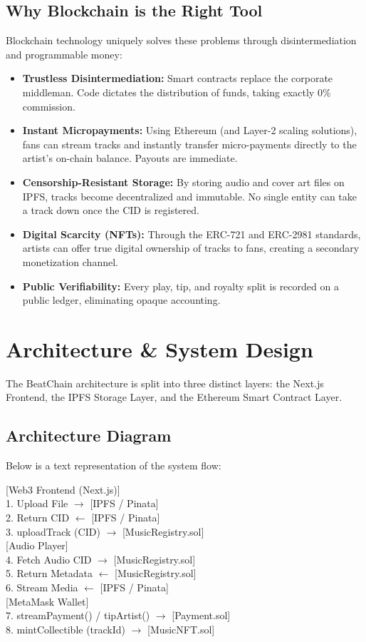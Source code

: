 \documentclass[11pt,a4paper]{article}
\begin{document}
\subsection{Why Blockchain is the Right Tool}
Blockchain technology uniquely solves these problems through disintermediation and programmable money:
\begin{itemize}
    \item \textbf{Trustless Disintermediation:} Smart contracts replace the corporate middleman. Code dictates the distribution of funds, taking exactly 0\% commission.
    \item \textbf{Instant Micropayments:} Using Ethereum (and Layer-2 scaling solutions), fans can stream tracks and instantly transfer micro-payments directly to the artist's on-chain balance. Payouts are immediate.
    \item \textbf{Censorship-Resistant Storage:} By storing audio and cover art files on IPFS, tracks become decentralized and immutable. No single entity can take a track down once the CID is registered.
    \item \textbf{Digital Scarcity (NFTs):} Through the ERC-721 and ERC-2981 standards, artists can offer true digital ownership of tracks to fans, creating a secondary monetization channel.
    \item \textbf{Public Verifiability:} Every play, tip, and royalty split is recorded on a public ledger, eliminating opaque accounting.
\end{itemize}

\section{Architecture \& System Design}
The BeatChain architecture is split into three distinct layers: the Next.js Frontend, the IPFS Storage Layer, and the Ethereum Smart Contract Layer.

\subsection{Architecture Diagram}
Below is a text representation of the system flow:
\begin{center}
    [Web3 Frontend (Next.js)] \\
    1. Upload File $\to$ [IPFS / Pinata] \\
    2. Return CID $\leftarrow$ [IPFS / Pinata] \\
    3. uploadTrack (CID) $\to$ [MusicRegistry.sol] \\
    \vspace{0.5em}
    [Audio Player] \\
    4. Fetch Audio CID $\to$ [MusicRegistry.sol] \\
    5. Return Metadata $\leftarrow$ [MusicRegistry.sol] \\
    6. Stream Media $\leftarrow$ [IPFS / Pinata] \\
    \vspace{0.5em}
    [MetaMask Wallet] \\
    7. streamPayment() / tipArtist() $\to$ [Payment.sol] \\
    8. mintCollectible (trackId) $\to$ [MusicNFT.sol]
\end{center}
\end{document}

